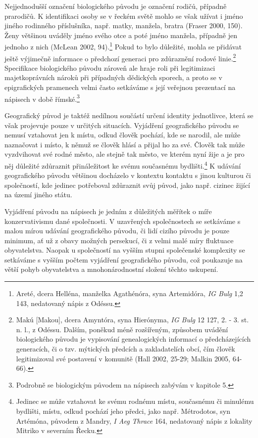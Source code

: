 Nejjednodušší označení biologického původu je označení rodičů, případně prarodičů. K identifikaci osoby se v řeckém světě mohlo se však užívat i jméno jiného rodinného příslušníka, např. matky, manžela, bratra (Fraser 2000, 150). Ženy většinou uváděly jméno svého otce a poté jméno manžela, případně jen jednoho z nich (McLean 2002, 94).\footnote{Areté, dcera Helléna, manželka Agathénóra, syna Artemidóra, {\em IG Bulg} 1,2 143, nedatovaný nápis z Odéssu.} Pokud to bylo důležité, mohla se přidávat ještě výjimečně informace o předchozí generaci pro zdůraznění rodové linie.\footnote{Makú {[}Makou{]}, dcera Amyntóra, syna Hierónyma, {\em IG Bulg} 12 127, 2. - 3. st. n. l., z Odéssu. Dalším, poněkud méně rozšířeným, způsobem uvádění biologického původu je vypisování genealogických informací o předcházejících generacích, či o tzv. mýtických předcích a zakladatelích obcí, čím člověk legitimizoval své postavení v komunitě (Hall 2002, 25-29; Malkin 2005, 64-66).} Specifikace biologického původu zároveň ale hraje roli při legitimizaci majetkoprávních nároků při případných dědických sporech, a proto se v epigrafických pramenech velmi často setkáváme s její veřejnou prezentací na nápisech v době římské.\footnote{Podrobně se biologickým původem na nápisech zabývám v kapitole 5.}

Geografický původ je taktéž nedílnou součástí určení identity jednotlivce, která se však projevuje pouze v určitých situacích. Vyjádření geografického původu se nemusí vztahovat jen k místu, odkud člověk pochází, kde se narodil, ale může naznačovat i místo, k němuž se člověk hlásí a přijal ho za své. Člověk tak může vyzdvihovat své rodné město, ale stejně tak město, ve kterém nyní žije a je pro něj důležité zdůraznit přináležitost ke svému současnému bydlišti.\footnote{Jedinec se může vztahovat ke svému rodnému místu, současnému či minulému bydlišti, místu, odkud pochází jeho předci, jako např. Métrodotos, syn Artémóna, původem z Mandry, {\em I Aeg Thrace} 164, nedatovaný nápis z lokality Mitriko v severním Řecku.} K udávání geografického původu většinou docházelo v kontextu kontaktu s jinou kulturou či společností, kde jedinec potřeboval zdůraznit svůj původ, jako např. cizinec žijící na území jiného státu.

Vyjádření původu na nápisech je jedním z důležitých měřítek o míře konzervativismu dané společnosti. V uzavřených společnostech se setkáváme s malou mírou udávání geografického původu, či lidí cizího původu je pouze minimum, ať už z obavy možných persekucí, či z velmi malé míry fluktuace obyvatelstva. Naopak u společností na vyšším stupni společenské komplexity se setkáváme s vyšším počtem vyjádření geografického původu, což poukazuje na větší pohyb obyvatelstva a mnohonárodnostní složení těchto uskupení.

